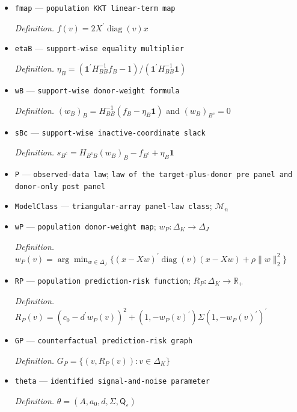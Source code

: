\documentclass{article}
\begin{document}
\begin{itemize}
  \item \texttt{fmap} --- \texttt{population KKT linear-\allowbreak{}term map}
  \par\smallskip\noindent\emph{Definition.} \(f(v)=2X^{\prime}\operatorname{diag}(v)x\)
  \item \texttt{etaB} --- \texttt{support-\allowbreak{}wise equality multiplier}
  \par\smallskip\noindent\emph{Definition.} \(\eta_B=(\mathbf 1^{\prime}H_{BB}^{-1}f_B-1)/(\mathbf 1^{\prime}H_{BB}^{-1}\mathbf 1)\)
  \item \texttt{wB} --- \texttt{support-\allowbreak{}wise donor-\allowbreak{}weight formula}
  \par\smallskip\noindent\emph{Definition.} \((w_B)_B=H_{BB}^{-1}(f_B-\eta_B\mathbf 1)\) and \((w_B)_{B^c}=0\)
  \item \texttt{sBc} --- \texttt{support-\allowbreak{}wise inactive-\allowbreak{}coordinate slack}
  \par\smallskip\noindent\emph{Definition.} \(s_{B^c}=H_{B^cB}(w_B)_B-f_{B^c}+\eta_B\mathbf 1\)
  \item \texttt{P} --- \texttt{observed-\allowbreak{}data law}; \texttt{law of the target-\allowbreak{}plus-\allowbreak{}donor pre panel and donor-\allowbreak{}only post panel}
  \item \texttt{ModelClass} --- \texttt{triangular-\allowbreak{}array panel-\allowbreak{}law class}; \(\mathcal M_n\)
  \item \texttt{wP} --- \texttt{population donor-\allowbreak{}weight map}; \(w_P:\Delta_K\to\Delta_J\)
  \par\smallskip\noindent\emph{Definition.} \(w_P(v)=\arg\min_{w\in\Delta_J}\{(x-Xw)^{\prime}\operatorname{diag}(v)(x-Xw)+\rho\lVert w\rVert_2^2\}\)
  \item \texttt{RP} --- \texttt{population prediction-\allowbreak{}risk function}; \(R_P:\Delta_K\to\mathbb R_{+}\)
  \par\smallskip\noindent\emph{Definition.} \(R_P(v)=(c_0-d^{\prime}w_P(v))^2+(1,-w_P(v)^{\prime})\Sigma(1,-w_P(v)^{\prime})^{\prime}\)
  \item \texttt{GP} --- \texttt{counterfactual prediction-\allowbreak{}risk graph}
  \par\smallskip\noindent\emph{Definition.} \(G_P=\{(v,R_P(v)):v\in\Delta_K\}\)
  \item \texttt{theta} --- \texttt{identified signal-\allowbreak{}and-\allowbreak{}noise parameter}
  \par\smallskip\noindent\emph{Definition.} \(\theta=(A,a_0,d,\Sigma,\mathsf Q_{\varepsilon})\)

\end{itemize}
\end{document}
